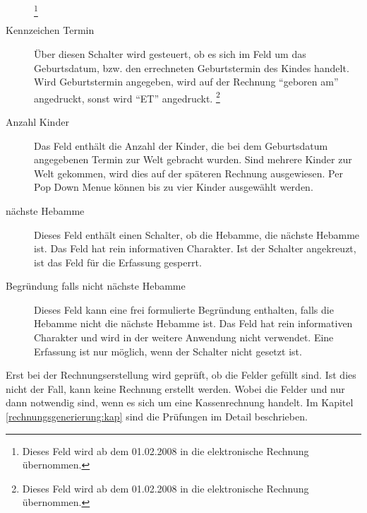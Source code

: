 \begin{description}
\footnote{Dieses Feld wird ab dem 01.02.2008 in die elektronische
Rechnung übernommen.}
\item[Kennzeichen Termin]
Über diesen Schalter wird gesteuert, ob es sich im Feld 
um das Geburtsdatum,  bzw. den errechneten Geburtstermin des Kindes
handelt. Wird Geburtstermin angegeben, wird auf der Rechnung ``geboren am'' 
angedruckt, sonst wird ``ET'' angedruckt.
\footnote{Dieses Feld wird ab dem 01.02.2008 in die elektronische
Rechnung übernommen.}
\item[Anzahl Kinder] Das Feld enthält die Anzahl der Kinder, die bei dem
Geburtsdatum angegebenen Termin zur Welt gebracht wurden. Sind mehrere
Kinder zur Welt gekommen, wird dies auf der späteren Rechnung ausgewiesen.
Per Pop Down Menue können bis zu vier Kinder ausgewählt werden.
\item[nächste Hebamme] Dieses Feld enthält einen Schalter, ob die Hebamme,
die nächste Hebamme ist. Das Feld hat rein informativen Charakter. Ist der
Schalter angekreuzt, ist das Feld  für die Erfassung gesperrt.
\item[Begründung falls nicht nächste Hebamme] Dieses Feld kann eine frei
formulierte Begründung enthalten, falls die Hebamme nicht die nächste Hebamme
ist. Das Feld hat rein informativen Charakter und wird in der weitere
Anwendung nicht verwendet. Eine Erfassung ist nur möglich, wenn der Schalter
 nicht gesetzt ist.
\end{description}
Erst bei der Rechnungserstellung wird geprüft, ob die Felder
 gefüllt sind. Ist dies nicht der Fall, kann keine
Rechnung erstellt werden. Wobei die Felder  und 
nur dann notwendig sind, wenn es sich um eine Kassenrechnung handelt.
Im Kapitel \vref{rechnungsgenerierung:kap} sind die Prüfungen im Detail
beschrieben.

